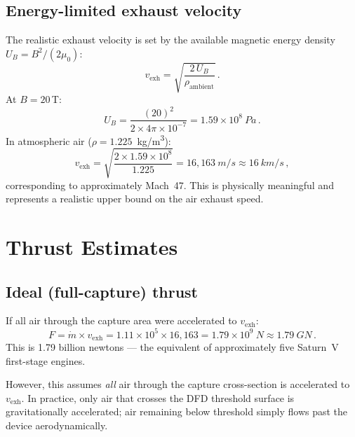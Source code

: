 \documentclass[12pt,twocolumn]{article}
\newcommand{\mdot}{\dot{m}}
\newcommand{\vexh}{v_{\mathrm{exh}}}
\begin{document}
\subsection{Energy-limited exhaust velocity}

The realistic exhaust velocity is set by the available magnetic energy
density $U_B = B^2/(2\mu_0)$:
\begin{equation}
  \vexh = \sqrt{\frac{2\,U_B}{\rho_\mathrm{ambient}}}\,.
  \label{eq:vexh-energy}
\end{equation}
At $B = 20$\,T:
\begin{equation}
  U_B = \frac{(20)^2}{2 \times 4\pi \times 10^{-7}}
      = 1.59 \times 10^8~\si{Pa}\,.
\end{equation}
In atmospheric air ($\rho = 1.225$~\si{kg/m^3}):
\begin{equation}
  \vexh = \sqrt{\frac{2 \times 1.59 \times 10^8}{1.225}}
        = 16{,}163~\si{m/s}
        \approx 16~\si{km/s}\,,
  \label{eq:vexh-num}
\end{equation}
corresponding to approximately Mach~47. This is physically meaningful
and represents a realistic upper bound on the air exhaust speed.

\section{Thrust Estimates}
\label{sec:thrust}

\subsection{Ideal (full-capture) thrust}

If all air through the capture area were accelerated to $\vexh$:
\begin{equation}
  F = \mdot \times \vexh
    = 1.11 \times 10^5 \times 16{,}163
    = 1.79 \times 10^9~\si{N}
    \approx 1.79~\si{GN}\,.
  \label{eq:thrust-ideal}
\end{equation}
This is 1.79 billion newtons --- the equivalent of approximately five
Saturn~V first-stage engines.

However, this assumes \emph{all} air through the capture cross-section
is accelerated to $\vexh$. In practice, only air that crosses the DFD
threshold surface is gravitationally accelerated; air remaining below
threshold simply flows past the device aerodynamically.
\end{document}
